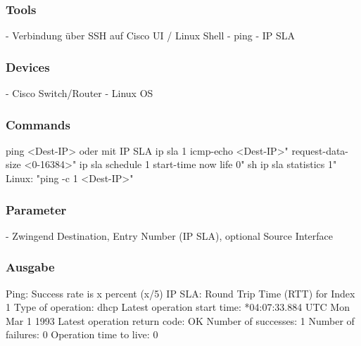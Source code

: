 \documentclass[a4,12pt]{scrartcl}
\begin{document}
\subsubsection{Tools}
- Verbindung über SSH auf Cisco UI / Linux Shell\newline
- ping\newline
- IP SLA\newline
\subsubsection{Devices}
- Cisco Switch/Router\newline
- Linux OS \newline
\subsubsection{Commands}
ping <Dest-IP>\newline\newline
oder mit IP SLA\newline
ip sla 1
icmp-echo <Dest-IP>"
request-data-size <0-16384>"\newline
ip sla schedule 1 start-time now life 0"\newline
sh ip sla statistics 1"\newline
{}
Linux: "ping -c 1 <Dest-IP>"
\subsubsection{Parameter}
- Zwingend Destination, Entry Number (IP SLA), optional Source Interface
\subsubsection{Ausgabe}
Ping: \newline	 
Success rate is x percent (x/5)\newline
IP SLA:\newline
Round Trip Time (RTT) for Index 1\newline
Type of operation: dhcp\newline
Latest operation start time: *04:07:33.884 UTC Mon Mar 1 1993\newline
Latest operation return code: OK\newline
Number of successes: 1\newline
Number of failures: 0\newline
Operation time to live: 0\newline
\end{document}
